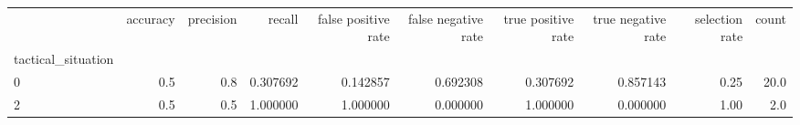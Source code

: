 \begin{tabular}{lrrrrrrrrr}
\toprule
{} &  accuracy &  precision &    recall &  false positive rate &  false negative rate &  true positive rate &  true negative rate &  selection rate &  count \\
tactical\_situation &           &            &           &                      &                      &                     &                     &                 &        \\
\midrule
0                  &       0.5 &        0.8 &  0.307692 &             0.142857 &             0.692308 &            0.307692 &            0.857143 &            0.25 &   20.0 \\
2                  &       0.5 &        0.5 &  1.000000 &             1.000000 &             0.000000 &            1.000000 &            0.000000 &            1.00 &    2.0 \\
\bottomrule
\end{tabular}
